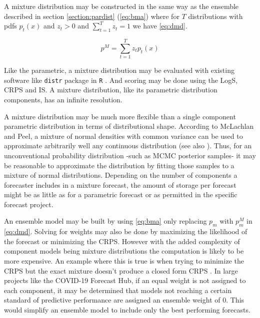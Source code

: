 \documentclass[11pt,notitlepage]{isuthesis}
\begin{document}
A mixture distribution may be constructed in the same way as the
ensemble described in section \ref{section:pardist} 
(\ref{eq:bma}) 
where for $T$ distributions
with pdfs $p_t(x)$ and $z_t > 0$ and $\sum_{t=1}^{T} z_t = 1$ we have 
\eqref{eq:dmd}.
 

\begin{equation}
\label{eq:dmd}
  p^{M} = \sum_{t=1}^T z_tp_t(x)
\end{equation}




Like the parametric, a mixture distribution may be evaluated with
existing software like \texttt{distr} package in \texttt{R} 
\cite[]{camphausen2007distr}. 
And 
scoring may be done  
using the LogS, CRPS and IS. A mixture distribution, like its parametric 
distribution components, has an infinite resolution.

A mixture distribution may be much more flexible than a single component 
parametric distribution in 
terms of distributional shape. According to 
McLachlan and Peel, a mixture of 
normal densities with common variance can be used to approximate arbitrarily 
well
any continuous distribution \cite[]{peel2000finite} (see also 
\cite[]{nguyen2019approximations}). Thus, for an unconventional probability
distribution -such as MCMC posterior samples- it may be reasonable to 
approximate the distribution by fitting those samples to a mixture of normal
distributions.
Depending on the number of components a forecaster includes in a mixture 
forecast, the amount of storage per forecast might be as little as for a 
parametric forecast or as permitted in the specific forecast project. 

An ensemble model may be built by using \eqref{eq:bma} only replacing $p_m$
with $p_m^M$ in \eqref{eq:dmd}. Solving for weights may also be done by 
maximizing
the likelihood of the forecast or minimizing the CRPS. However with the 
added complexity of component models being mixture distributions the 
computation is likely to be more expensive. An example where this is
true is when trying to minimize the CRPS but the exact mixture doesn't 
produce a closed form CRPS \cite[]{baran2018combining}. In large projects like
the COVID-19 Forecast Hub, if an equal weight is not assigned to each component,
it may be determined that models not reaching a certain standard of predictive
performance are
assigned an ensemble weight of 0. This would simplify an ensemble model to 
include only the best performing forecasts.
\end{document}
